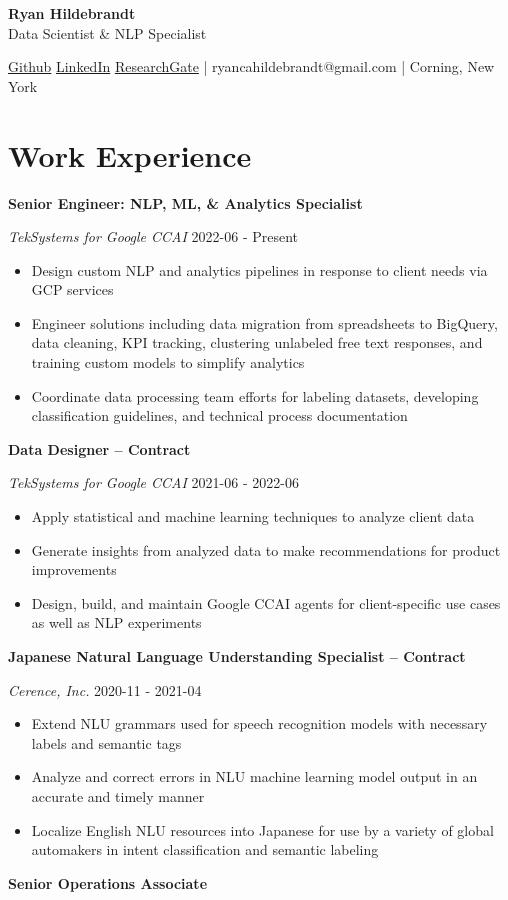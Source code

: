\documentclass[a4paper,9pt]{extarticle}
\begin{document}
\begin{center}\textbf{\Large Ryan Hildebrandt}\\[2pt]
Data Scientist \& NLP Specialist

\href{https://github.com/ryancahildebrandt}{Github}
\href{https://linkedin.com/in/rcah}{LinkedIn}
\href{https://researchgate.net/profile/Ryan-Hildebrandt}{ResearchGate}
 | ryancahildebrandt@gmail.com | Corning, New York
\end{center}

\section*{Work Experience}
\noindent\textbf{Senior Engineer: NLP, ML, \& Analytics Specialist} 

\noindent\textit{TekSystems for Google CCAI} \hfill 2022-06 - Present
\begin{itemize}\item Design custom NLP and analytics pipelines in response to client needs via GCP services
\item Engineer solutions including data migration from spreadsheets to BigQuery, data cleaning, KPI tracking, clustering unlabeled free text responses, and training custom models to simplify analytics
\item Coordinate data processing team efforts for labeling datasets, developing classification guidelines, and technical process documentation
\end{itemize}
\noindent\textbf{Data Designer -- Contract} 

\noindent\textit{TekSystems for Google CCAI} \hfill 2021-06 - 2022-06
\begin{itemize}\item Apply statistical and machine learning techniques to analyze client data
\item Generate insights from analyzed data to make recommendations for product improvements
\item Design, build, and maintain Google CCAI agents for client-specific use cases as well as NLP experiments
\end{itemize}
\noindent\textbf{Japanese Natural Language Understanding Specialist -- Contract} 

\noindent\textit{Cerence, Inc.} \hfill 2020-11 - 2021-04
\begin{itemize}\item Extend NLU grammars used for speech recognition models with necessary labels and semantic tags
\item Analyze and correct errors in NLU machine learning model output in an accurate and timely manner
\item Localize English NLU resources into Japanese for use by a variety of global automakers in intent classification and semantic labeling
\end{itemize}
\noindent\textbf{Senior Operations Associate} 
\end{document}
